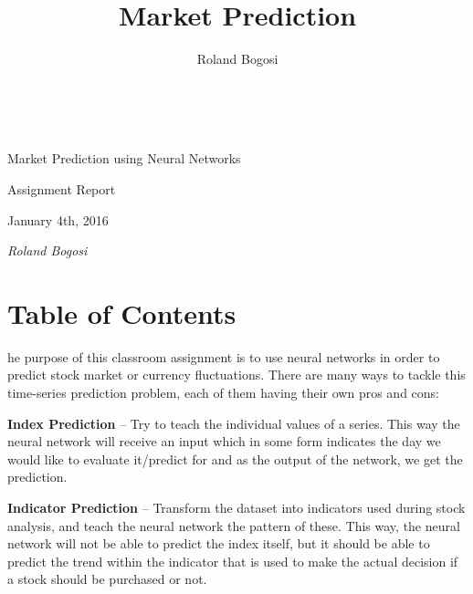 \documentclass[a4paper,12pt]{article}
\author{Roland Bogosi}
\title{Market Prediction}
\begin{document}
\thispagestyle{empty}
	 
	\begin{center}
		\vspace{3.1in}
		
		{\sffamily\huge Market Prediction using Neural Networks}
		
		\vspace{0.4in}
		
		{\sffamily\LARGE Assignment Report}
		
		\vspace{0.3in}
		
		{\sffamily\Large January 4th, 2016}
		
		\vspace{3.2in}
	\end{center}
	
	\begin{flushright}
		{\sffamily\itshape\Large Roland Bogosi}
	\end{flushright}

\newpage
\thispagestyle{empty}
\section*{Table of Contents}

	\begingroup
	\renewcommand{\section}[2]{}
	\hypersetup{linkcolor=blue}
	\setlength{\parskip}{0em}
	\tableofcontents
	\endgroup

\newpage
\section{Introduction}

	The purpose of this classroom assignment is to use neural networks in order to predict stock market or currency fluctuations. There are many ways to tackle this time-series prediction problem, each of them having their own pros and cons:
	
	\textbf{Index Prediction} -- Try to teach the individual values of a series. This way the neural network will receive an input which in some form indicates the day we would like to evaluate it/predict for and as the output of the network, we get the prediction.
	
	\textbf{Indicator Prediction} -- Transform the dataset into indicators used during stock analysis, and teach the neural network the pattern of these. This way, the neural network will not be able to predict the index itself, but it should be able to predict the trend within the indicator that is used to make the actual decision if a stock should be purchased or not.
		
\end{document}
